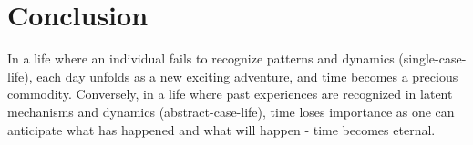 \documentclass{article}
\begin{document}
    \section{Conclusion}

    In a life where an individual fails to recognize patterns and dynamics (single-case-life), each day unfolds as a new exciting adventure, and time becomes a precious commodity. Conversely, in a life where past experiences are recognized in latent mechanisms and dynamics (abstract-case-life), time loses importance as one can anticipate what has happened and what will happen - time becomes eternal.
\end{document}
